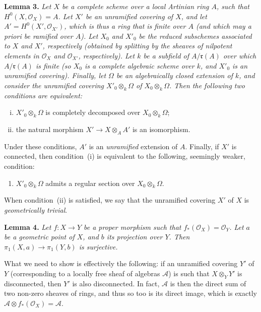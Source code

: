 \documentclass{article}
\newenvironment{itenv}[1]
  {\phantomsection\par\medskip\noindent\textbf{#1.}\itshape}
  {\medskip}
\newcommand{\scr}[1]{{\mathscr{#1}}}
\newcommand{\fk}{\mathfrak}
\newcommand{\oldpage}[1]{\marginpar{\footnotesize$\Big\vert$ \textit{p.~#1}}}
\begin{document}
\begin{itenv}{Lemma 3}
\label{lemma3}
  Let $X$ be a complete scheme over a local Artinian ring $A$, such that $H^0(X,\scr{O}_X)=A$.
  Let $X'$ be an unramified covering of $X$, and let $A'=H^0(X',\scr{O}_{X'})$, which is thus a ring that is finite over $A$ (and which may a priori be ramified over $A$).
  Let $X_0$ and $X'_0$ be the reduced subschemes associated to $X$ and $X'$, respectively (obtained by splitting by the sheaves of nilpotent elements in $\scr{O}_X$ and $\scr{O}_{X'}$, respectively).
  Let $k$ be a subfield of $A/\fk{r}(A)$ over which $A/\fk{r}(A)$ is finite (so $X_0$ is a complete algebraic scheme over $k$, and $X'_0$ is an unramified covering).
  Finally, let $\Omega$ be an algebraically closed extension of $k$, and consider the unramified covering $X'_0\otimes_k\Omega$ of $X_0\otimes_k\Omega$.
  Then the following two conditions are equivalent:
\oldpage{182-20}
  \begin{enumerate}[i.]
    \item $X'_0\otimes_k\Omega$ is completely decomposed over $X_0\otimes_k\Omega$;
    \item the natural morphism $X'\to X\otimes_AA'$ is an isomorphism.
  \end{enumerate}

  Under these conditions, $A'$ is an \emph{unramified} extension of $A$.
  Finally, if $X'$ is connected, then condition~(i) is equivalent to the following, seemingly weaker, condition:
  \begin{enumerate}[i bis.]
    \item $X'_0\otimes_k\Omega$ admits a regular section over $X_0\otimes_k\Omega$.
  \end{enumerate}
\end{itenv}

When condition~(ii) is satisfied, we say that the unramified covering $X'$ of $X$ is \emph{geometrically trivial}.

\begin{itenv}{Lemma 4}
\label{lemma4}
  Let $f\colon X\to Y$ be a proper morphism such that $f_*(\scr{O}_X)=\scr{O}_Y$.
  Let $a$ be a geometric point of $X$, and $b$ its projection over $Y$.
  Then $\pi_1(X,a)\to\pi_1(Y,b)$ is \emph{surjective}.
\end{itenv}

What we need to show is effectively the following: if an unramified covering $Y'$ of $Y$ (corresponding to a locally free sheaf of algebras $\scr{A}$) is such that $X\otimes_YY'$ is disconnected, then $Y'$ is also disconnected.
In fact, $\scr{A}$ is then the direct sum of two non-zero sheaves of rings, and thus so too is its direct image, which is exactly $\scr{A}\otimes f_*(\scr{O}_X)=\scr{A}$.
\end{document}

